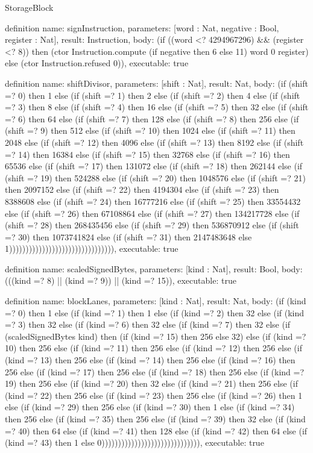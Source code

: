 \begin{lexlean}{StorageBlock}
\begin{semanticmodule}
definition{
  name: signInstruction,
  parameters: [word : Nat, negative : Bool, register : Nat],
  result: Instruction,
  body: (if ((word <? 4294967296) && (register <? 8)) then (ctor Instruction.compute (if negative then 6 else 11) word 0 register) else (ctor Instruction.refused 0)),
  executable: true
}

definition{
  name: shiftDivisor,
  parameters: [shift : Nat],
  result: Nat,
  body: (if (shift =? 0) then 1 else (if (shift =? 1) then 2 else (if (shift =? 2) then 4 else (if (shift =? 3) then 8 else (if (shift =? 4) then 16 else (if (shift =? 5) then 32 else (if (shift =? 6) then 64 else (if (shift =? 7) then 128 else (if (shift =? 8) then 256 else (if (shift =? 9) then 512 else (if (shift =? 10) then 1024 else (if (shift =? 11) then 2048 else (if (shift =? 12) then 4096 else (if (shift =? 13) then 8192 else (if (shift =? 14) then 16384 else (if (shift =? 15) then 32768 else (if (shift =? 16) then 65536 else (if (shift =? 17) then 131072 else (if (shift =? 18) then 262144 else (if (shift =? 19) then 524288 else (if (shift =? 20) then 1048576 else (if (shift =? 21) then 2097152 else (if (shift =? 22) then 4194304 else (if (shift =? 23) then 8388608 else (if (shift =? 24) then 16777216 else (if (shift =? 25) then 33554432 else (if (shift =? 26) then 67108864 else (if (shift =? 27) then 134217728 else (if (shift =? 28) then 268435456 else (if (shift =? 29) then 536870912 else (if (shift =? 30) then 1073741824 else (if (shift =? 31) then 2147483648 else 1)))))))))))))))))))))))))))))))),
  executable: true
}

definition{
  name: scaledSignedBytes,
  parameters: [kind : Nat],
  result: Bool,
  body: (((kind =? 8) || (kind =? 9)) || (kind =? 15)),
  executable: true
}

definition{
  name: blockLanes,
  parameters: [kind : Nat],
  result: Nat,
  body: (if (kind =? 0) then 1 else (if (kind =? 1) then 1 else (if (kind =? 2) then 32 else (if (kind =? 3) then 32 else (if (kind =? 6) then 32 else (if (kind =? 7) then 32 else (if (scaledSignedBytes kind) then (if (kind =? 15) then 256 else 32) else (if (kind =? 10) then 256 else (if (kind =? 11) then 256 else (if (kind =? 12) then 256 else (if (kind =? 13) then 256 else (if (kind =? 14) then 256 else (if (kind =? 16) then 256 else (if (kind =? 17) then 256 else (if (kind =? 18) then 256 else (if (kind =? 19) then 256 else (if (kind =? 20) then 32 else (if (kind =? 21) then 256 else (if (kind =? 22) then 256 else (if (kind =? 23) then 256 else (if (kind =? 26) then 1 else (if (kind =? 29) then 256 else (if (kind =? 30) then 1 else (if (kind =? 34) then 256 else (if (kind =? 35) then 256 else (if (kind =? 39) then 32 else (if (kind =? 40) then 64 else (if (kind =? 41) then 128 else (if (kind =? 42) then 64 else (if (kind =? 43) then 1 else 0)))))))))))))))))))))))))))))),
  executable: true
}


\end{semanticmodule}
\end{lexlean}
